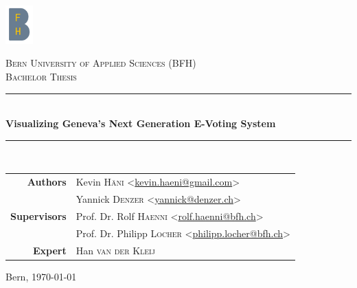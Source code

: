 \begin{titlepage}
\begin{center}
	\includegraphics[width=0.08\textwidth]{assets/bfh_logo.png}

	\vspace{1cm}

	\textsc{\Large Bern University of Applied Sciences (BFH)} \\[1.5cm]
	\textsc{\Large Bachelor Thesis} \\[1cm]

	\newcommand{\HRule}{\rule{\linewidth}{0.3mm}}
	\HRule \\[0.4cm]
	{\Large \bfseries Visualizing Geneva's Next Generation E-Voting System} \\
	\HRule \\[1.5cm]

	\begin{tabular}{rl}
	\textbf{Authors}
	& Kevin \textsc{Häni} <\href{mailto:kevin.haeni@gmail.com}{kevin.haeni@gmail.com}> \\
	& Yannick \textsc{Denzer} <\href{mailto:yannick@denzer.ch}{yannick@denzer.ch}> \\
	\textbf{Supervisors}
	& Prof. Dr. Rolf \textsc{Haenni} <\href{mailto:rolf.haenni@bfh.ch}{rolf.haenni@bfh.ch}> \\
	& Prof. Dr. Philipp \textsc{Locher} <\href{mailto:philipp.locher@bfh.ch}{philipp.locher@bfh.ch}> \\
	\textbf{Expert}
	 & Han \textsc{van der Kleij}
	\end{tabular}

	\vfill

	Bern, {\large \today}
\end{center}
\end{titlepage}
